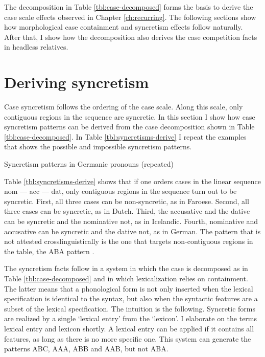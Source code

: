 The decomposition in Table \ref{tbl:case-decomposed} forms the basis to derive the case scale effects observed in Chapter \ref{ch:recurring}. The following sections show how morphological case containment and syncretism effects follow naturally. After that, I show how the decomposition also derives the case competition facts in headless relatives.


\section{Deriving syncretism}\label{sec:syncretism}

Case syncretism follows the ordering of the case scale. Along this scale, only contiguous regions in the sequence are syncretic. In this section I show how case syncretism patterns can be derived from the case decomposition shown in Table \ref{tbl:case-decomposed}.
In Table \ref{tbl:syncretisms-derive} I repeat the examples that shows the possible and impossible syncretism patterns.

\begin{table}[ht]
  \center
  \caption {Syncretism patterns in Germanic pronouns (repeated)}
    
  \label{tbl:syncretisms-derive}
\end{table}

Table \ref{tbl:syncretisms-derive} shows that if one orders cases in the linear sequence \ac{nom} --- \ac{acc} --- \ac{dat}, only contiguous regions in the sequence turn out to be syncretic. First, all three cases can be non-syncretic, as in Faroese. Second, all three cases can be syncretic, as in Dutch. Third, the accusative and the dative can be syncretic and the nominative not, as in Icelandic. Fourth, nominative and accusative can be syncretic and the dative not, as in German. The pattern that is not attested crosslinguistically is the one that targets non-contiguous regions in the table, the ABA pattern \citep{baerman2005,caha2009,zompi2017}.

The syncretism facts follow in a system in which the case is decomposed as in Table \ref{tbl:case-decomposed} and in which lexicalization relies on containment. The latter means that a phonological form is not only inserted when the lexical specification is identical to the syntax, but also when the syntactic features are a subset of the lexical specification. The intuition is the following. Syncretic forms are realized by a single `lexical entry' from the `lexicon'. I elaborate on the terms lexical entry and lexicon shortly.
A lexical entry can be applied if it contains all features, as long as there is no more specific one. This system can generate the patterns ABC, AAA, ABB and AAB, but not ABA.

